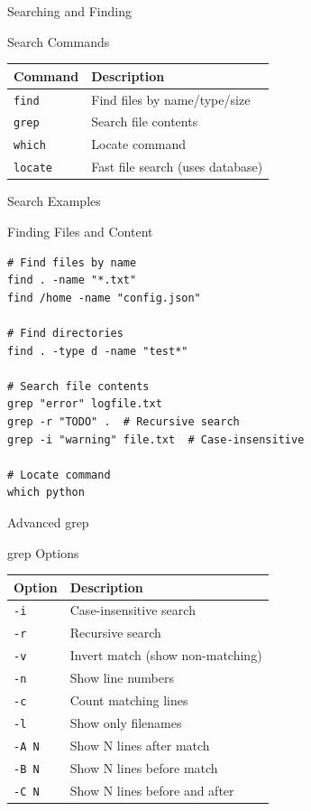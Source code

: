 \documentclass[presentation,aspectratio=1610]{beamer}
\begin{document}
\begin{frame}[label={sec:orgb60a2c1},fragile]{Searching and Finding}
 \begin{block}{Search Commands}
\begin{center}
\begin{tabular}{ll}
Command & Description\\
\hline
\texttt{find} & Find files by name/type/size\\
\texttt{grep} & Search file contents\\
\texttt{which} & Locate command\\
\texttt{locate} & Fast file search (uses database)\\
\end{tabular}
\end{center}
\end{block}
\end{frame}
\begin{frame}[label={sec:orgaa91e2a},fragile]{Search Examples}
 \begin{block}{Finding Files and Content}
\begin{verbatim}
# Find files by name
find . -name "*.txt"
find /home -name "config.json"

# Find directories
find . -type d -name "test*"

# Search file contents
grep "error" logfile.txt
grep -r "TODO" .  # Recursive search
grep -i "warning" file.txt  # Case-insensitive

# Locate command
which python
\end{verbatim}
\end{block}
\end{frame}
\begin{frame}[label={sec:orgcfbf65a},fragile]{Advanced grep}
 \begin{block}{grep Options}
\begin{center}
\begin{tabular}{ll}
Option & Description\\
\hline
\texttt{-i} & Case-insensitive search\\
\texttt{-r} & Recursive search\\
\texttt{-v} & Invert match (show non-matching)\\
\texttt{-n} & Show line numbers\\
\texttt{-c} & Count matching lines\\
\texttt{-l} & Show only filenames\\
\texttt{-A N} & Show N lines after match\\
\texttt{-B N} & Show N lines before match\\
\texttt{-C N} & Show N lines before and after\\
\end{tabular}
\end{center}
\end{block}
\end{frame}
\end{document}
